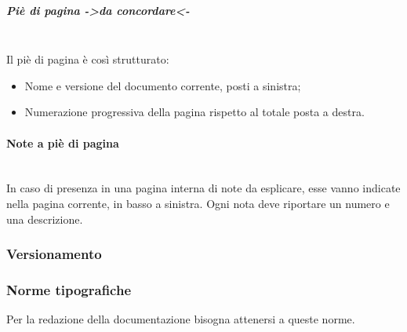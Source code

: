 			\subparagraph{Piè di pagina ->da concordare<-} \mbox{} \\
			Il piè di pagina è così strutturato:
			\begin{itemize}
				\item Nome e versione del documento corrente, posti a sinistra;
				\item Numerazione progressiva della pagina rispetto al totale posta a destra.
			\end{itemize}
		
		\paragraph{Note a piè di pagina} \mbox{} \\
		In caso di presenza in una pagina interna di note da esplicare, esse vanno indicate nella pagina corrente, in basso a sinistra. Ogni nota deve riportare un numero e una	descrizione.
		
	\subsubsection{Versionamento}
	\subsubsection{Norme tipografiche} Per la redazione della documentazione bisogna attenersi a queste norme.
		
